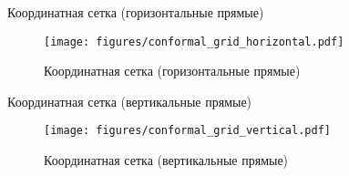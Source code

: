 \begin{frame}{Координатная сетка (горизонтальные прямые)}
	\begin{figure}
		\centering
		\texttt{[image: figures/conformal\_grid\_horizontal.pdf]}
		\caption{Координатная сетка (горизонтальные прямые)}\label{fig:conformal_grid_horizontal}
	\end{figure}
\end{frame}

\begin{frame}{Координатная сетка (вертикальные прямые)}
	\begin{figure}
		\centering
		\texttt{[image: figures/conformal\_grid\_vertical.pdf]}
		\caption{Координатная сетка (вертикальные прямые)}\label{fig:conformal_grid_vertical}
	\end{figure}
\end{frame}
